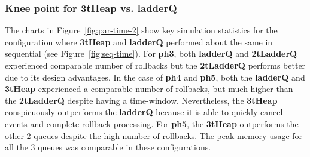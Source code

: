 \subsubsection{Knee point for \textbf{3tHeap} vs. \textbf{ladderQ}}

The charts in Figure~\ref{fig:par-time-2} show key simulation statistics for the configuration where \textbf{3tHeap} and \textbf{ladderQ}
performed about the same in sequential (see Figure~\ref{fig:seq-time}).  For \textbf{ph3}, both \textbf{ladderQ} and \textbf{2tLadderQ} experienced comparable number of rollbacks but the \textbf{2tLadderQ} performs better due to its design advantages. In the case of \textbf{ph4} and \textbf{ph5}, both the \textbf{ladderQ} and \textbf{3tHeap} experienced a comparable number of rollbacks, but much higher than the \textbf{2tLadderQ} despite having a time-window. Nevertheless, the \textbf{3tHeap} conspicuously outperforms the \textbf{ladderQ} because it is able to quickly cancel events and complete rollback processing. For \textbf{ph5}, the \textbf{3tHeap} outperforms the other 2 queues despite the high number of rollbacks. The peak memory usage for all the 3 queues was comparable in these configurations.

